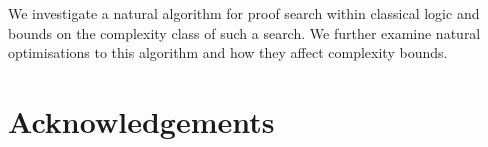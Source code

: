 \abstract
    We investigate a natural algorithm for proof search within classical logic and bounds on the complexity class of such a search.
    We further examine natural optimisations to this algorithm and how they affect complexity bounds.
\newpage


\tableofcontents
\newpage



\section*{Acknowledgements}
\newpage

